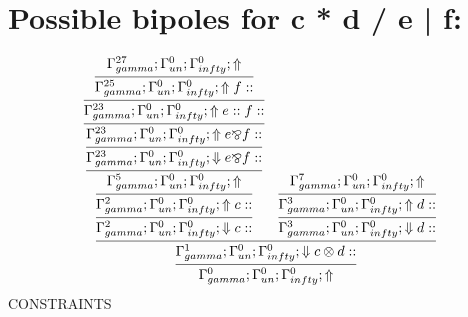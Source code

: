 \documentclass[a4paper, 11pt]{article}
\begin{document}
\section{Possible bipoles for c * d / e | f:} 

\[
\infer{\Gamma_{ gamma}^{0} ; \Gamma_{un}^{0} ; \Gamma_{ infty}^{0} ;  \Uparrow }
{\infer{\Gamma_{ gamma}^{1} ; \Gamma_{un}^{0} ; \Gamma_{ infty}^{0} ;  \Downarrow c \otimes d :: }
{\infer{\Gamma_{ gamma}^{2} ; \Gamma_{un}^{0} ; \Gamma_{ infty}^{0} ;  \Downarrow c :: }
{\infer{\Gamma_{ gamma}^{2} ; \Gamma_{un}^{0} ; \Gamma_{ infty}^{0} ;  \Uparrow c :: }
{\infer{\Gamma_{ gamma}^{5} ; \Gamma_{un}^{0} ; \Gamma_{ infty}^{0} ;  \Uparrow }
{\infer{\Gamma_{ gamma}^{23} ; \Gamma_{un}^{0} ; \Gamma_{ infty}^{0} ;  \Downarrow e \bindnasrepma f :: }
{\infer{\Gamma_{ gamma}^{23} ; \Gamma_{un}^{0} ; \Gamma_{ infty}^{0} ;  \Uparrow e \bindnasrepma f :: }
{\infer{\Gamma_{ gamma}^{23} ; \Gamma_{un}^{0} ; \Gamma_{ infty}^{0} ;  \Uparrow e :: f :: }
{\infer{\Gamma_{ gamma}^{25} ; \Gamma_{un}^{0} ; \Gamma_{ infty}^{0} ;  \Uparrow f :: }
{\Gamma_{ gamma}^{27} ; \Gamma_{un}^{0} ; \Gamma_{ infty}^{0} ;  \Uparrow }}}}}}}
&
\infer{\Gamma_{ gamma}^{3} ; \Gamma_{un}^{0} ; \Gamma_{ infty}^{0} ;  \Downarrow d :: }
{\infer{\Gamma_{ gamma}^{3} ; \Gamma_{un}^{0} ; \Gamma_{ infty}^{0} ;  \Uparrow d :: }
{\Gamma_{ gamma}^{7} ; \Gamma_{un}^{0} ; \Gamma_{ infty}^{0} ;  \Uparrow }}}}
\]
CONSTRAINTS
\end{document}
